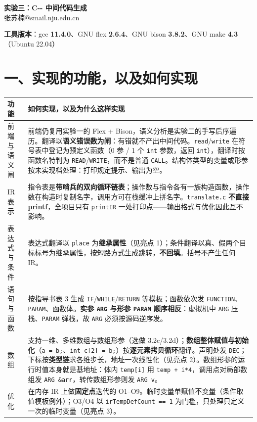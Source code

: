 \documentclass[11pt,a4paper]{ctexart}
\newcommand{\code}[1]{\texttt{#1}}
\begin{document}
\begin{center}
{\large\bfseries 实验三：C{-}{-} 中间代码生成}\\[3pt]
张苏楠@smail.nju.edu.cn
\end{center}

\textbf{工具版本}：gcc \textbf{11.4.0}、GNU flex \textbf{2.6.4}、GNU bison
\textbf{3.8.2}、GNU make \textbf{4.3}（Ubuntu 22.04）

\section*{一、实现的功能，以及如何实现}

{\normalsize
\setlength{\parindent}{0pt}
\begin{tabular}{@{}>{\raggedright\arraybackslash}m{2.7cm}m{13.3cm}@{}}
\hline
\textbf{功能} & \textbf{如何实现，以及为什么这样实现} \\
\hline
前端与语义闸 & 前端仍复用实验一的 Flex + Bison，语义分析是实验二的手写后序遍历。翻译以\textbf{语义错误数为闸}：有错就不产出中间代码。\code{read}/\code{write} 在符号表中登记为预定义函数（0 参 / 1 个 \code{int} 参数，返回 \code{int}），翻译时按函数名特判为 \code{READ}/\code{WRITE}，而不是普通 \code{CALL}。结构体类型的变量或形参按未实现档处理：打印规定提示、输出为空。\\
\hline
IR 表示 & 指令表是\textbf{带哨兵的双向循环链表}；操作数与指令各有一族构造函数，操作数在构造时复制名字，调用方可在栈缓冲上拼名字。\code{translate.c} \textbf{不直接 printf}，全项目只有 \code{printIR} 一处打印点——输出格式与优化因此互不影响。\\
\hline
表达式与条件 & 表达式翻译以 \code{place} 为\textbf{继承属性}（见亮点 1）；条件翻译以真、假两个目标标号为继承属性，按短路方式生成跳转，\textbf{不回填}。括号不产生任何 IR。\\
\hline
语句与函数 & 按指导书表 3 生成 \code{IF}/\code{WHILE}/\code{RETURN} 等模板；函数依次发 \code{FUNCTION}、\code{PARAM}、函数体。\textbf{实参 \code{ARG} 与形参 \code{PARAM} 顺序相反}：虚拟机中 \code{ARG} 压栈、\code{PARAM} 弹栈，故 \code{ARG} 必须按源码逆序发。\\
\hline
数组 & 支持一维、多维数组与数组形参（选做 3.2c/3.2d）；\textbf{数组整体赋值与初始化}（\code{a = b;}、\code{int c[2] = b;}）按\textbf{逐元素拷贝循环}翻译。声明处发 \code{DEC}；下标按\textbf{类型链}求各维步长，地址一次线性化（见亮点 2）。数组形参的运行时值本身就是基地址：体内 \code{temp[i]} 用 \code{temp + i*4}，调用点对局部数组发 \code{ARG \&arr}，转传数组形参则发 \code{ARG v}。\\
\hline
优化 & 在内存 IR 上做\textbf{固定点}迭代的 O1--O9。临时变量单赋值不变量（条件取值模板例外）；O3/O4 以 \code{irTempDefCount == 1} 为门槛，只处理只定义一次的临时变量（见亮点 3）。\\
\hline
\end{tabular}}
\end{document}
